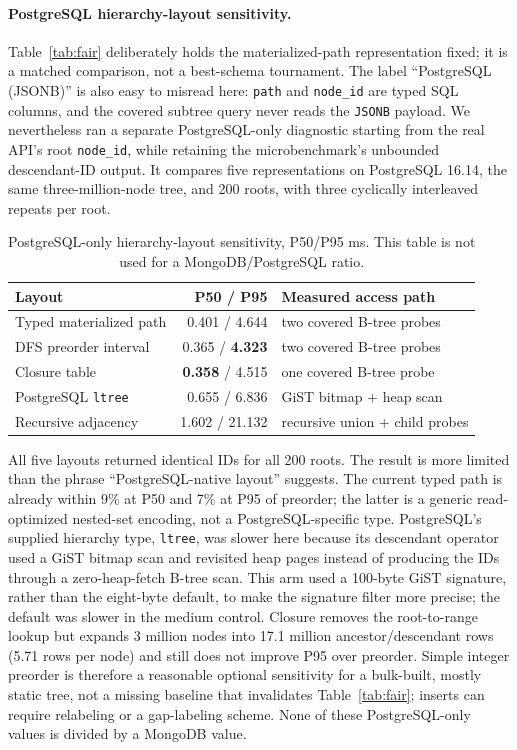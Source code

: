 \documentclass[11pt]{article}
\newcommand{\code}[1]{\texttt{#1}}
\newcommand{\best}[1]{\textbf{#1}}
\newcommand{\hdr}{\rowcolor{hdrgray}}
\newenvironment{ctab}{\par\medskip\centering\small
  \setlength{\tabcolsep}{5pt}\renewcommand{\arraystretch}{1.12}}{\par\medskip}
\begin{document}
\paragraph{PostgreSQL hierarchy-layout sensitivity.}
Table~\ref{tab:fair} deliberately holds the materialized-path representation
fixed; it is a matched comparison, not a best-schema tournament. The label
``PostgreSQL (JSONB)'' is also easy to misread here: \code{path} and
\code{node\_id} are typed SQL columns, and the covered subtree query never
reads the \code{JSONB} payload. We nevertheless ran a separate PostgreSQL-only
diagnostic starting from the real API's root \code{node\_id}, while retaining
the microbenchmark's unbounded descendant-ID output. It compares five
representations on PostgreSQL 16.14, the same three-million-node tree, and 200
roots, with three cyclically interleaved repeats per root.

\begin{table}[t]
\caption{PostgreSQL-only hierarchy-layout sensitivity, P50/P95 ms. This table
is not used for a MongoDB/PostgreSQL ratio.}
\label{tab:pg-hierarchy}
\begin{ctab}
\begin{tabular}{@{}lrl@{}}
\toprule
\hdr Layout & P50 / P95 & Measured access path \\
\midrule
Typed materialized path & 0.401 / 4.644 & two covered B-tree probes \\
DFS preorder interval & 0.365 / \best{4.323} & two covered B-tree probes \\
Closure table & \best{0.358} / 4.515 & one covered B-tree probe \\
PostgreSQL \code{ltree} & 0.655 / 6.836 & GiST bitmap + heap scan \\
Recursive adjacency & 1.602 / 21.132 & recursive union + child probes \\
\bottomrule
\end{tabular}
\end{ctab}
\end{table}

All five layouts returned identical IDs for all 200 roots. The result is more
limited than the phrase ``PostgreSQL-native layout'' suggests. The current
typed path is already within 9\% at P50 and 7\% at P95 of preorder; the latter
is a generic read-optimized nested-set encoding, not a PostgreSQL-specific
type. PostgreSQL's supplied hierarchy type, \code{ltree}, was slower here
because its descendant operator used a GiST bitmap scan and revisited heap
pages instead of producing the IDs through a zero-heap-fetch B-tree scan.
This arm used a 100-byte GiST signature, rather than the eight-byte default, to
make the signature filter more precise; the default was slower in the medium
control.
Closure removes the root-to-range lookup but expands 3 million nodes into
17.1 million ancestor/descendant rows (5.71 rows per node) and still does not
improve P95 over preorder. Simple integer preorder is therefore a reasonable
optional sensitivity for a bulk-built, mostly static tree, not a missing
baseline that invalidates Table~\ref{tab:fair}; inserts can require relabeling
or a gap-labeling scheme. None of these PostgreSQL-only values is divided by a
MongoDB value.
\end{document}

